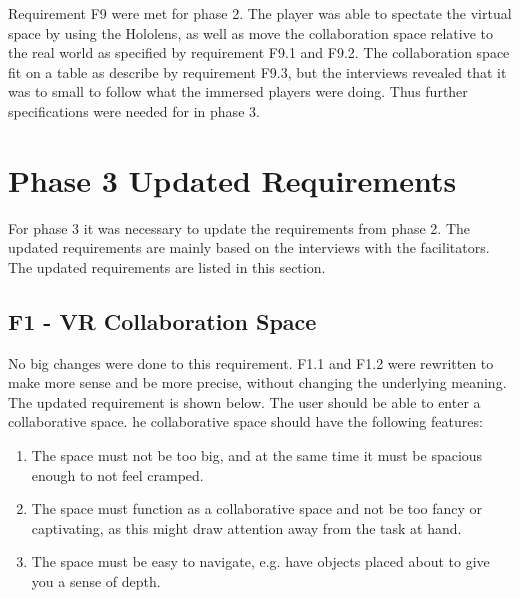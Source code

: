        Requirement F9 were met for phase 2. The player was able to spectate the virtual space by using the Hololens, as well as move the collaboration space relative to the real world as specified by requirement F9.1 and F9.2. The collaboration space fit on a table as describe by requirement F9.3, but the interviews revealed that it was to small to follow what the immersed players were doing. Thus further specifications were needed for in phase 3.
        
        
    \section{Phase 3 Updated Requirements} %
    For phase 3 it was necessary to update the requirements from phase 2. The updated requirements are mainly based on the interviews with the facilitators. The updated requirements are listed in this section.
    
        \subsection{F1 - VR Collaboration Space} %
        No big changes were done to this requirement. F1.1 and F1.2 were rewritten to make more sense and be more precise, without changing the underlying meaning. The updated requirement is shown below.
        \newline\newline
        The user should be able to enter a collaborative space. he collaborative space should have the following features:
        \begin{enumerate}
            \item The space must not be too big, and at the same time it must be spacious enough to not feel cramped.
            \item The space must function as a collaborative space and not be too fancy or captivating, as this might draw attention away from the task at hand.
            \item The space must be easy to navigate, e.g. have objects placed about to give you a sense of depth.
        \end{enumerate}
        
